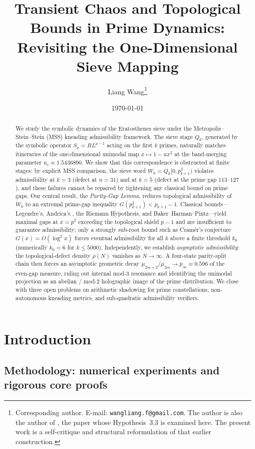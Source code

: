 \documentclass[11pt,a4paper]{article}
\title{Transient Chaos and Topological Bounds in Prime Dynamics:\\
       Revisiting the One-Dimensional Sieve Mapping}
\author[1]{Liang Wang\thanks{Corresponding author. E-mail:
\texttt{wangliang.f@gmail.com}. The author is also the author of
\cite{wang2026emergence}, the paper whose Hypothesis~3.3 is examined
here. The present work is a self-critique and structural reformulation
of that earlier construction.}}
\affil[1]{School of Artificial Intelligence and Automation,
Huazhong University of Science and Technology,
Wuhan 430074, P.R. China}
\date{\today}
\theoremstyle{definition}
\begin{document}
\maketitle

\begin{abstract}
We study the symbolic dynamics of the Eratosthenes sieve under the
Metropolis--Stein--Stein (MSS) kneading admissibility framework. The
sieve stage $Q_k$, generated by the symbolic operator $S_p = R L^{p-1}$
acting on the first $k$ primes, naturally matches itineraries of the
one-dimensional unimodal map $x \mapsto 1 - u x^2$ at the band-merging
parameter $u_c \approx 1.5436890$. We show that this correspondence is
obstructed at finite stages: by explicit MSS comparison, the sieve word
$W_k = Q_k[0, p_{k+1}^2)$ violates admissibility at $k = 3$ (defect at
$n = 31$) and at $k = 5$ (defect at the prime gap $113$--$127$), and
these failures cannot be repaired by tightening any classical bound on
prime gaps. Our central result, the \emph{Parity-Gap Lemma}, reduces
topological admissibility of $W_k$ to an extremal prime-gap inequality
$G(p_{k+1}^2) < p_{k+1} - 1$. Classical bounds---Legendre's, Andrica's
\cite{andrica1986conjecture}, the Riemann Hypothesis, and
Baker--Harman--Pintz---yield maximal gaps at $x = p^2$ exceeding the
topological shield $p - 1$ and are insufficient to guarantee
admissibility; only a strongly sub-root bound such as Cram\'er's
conjecture $G(x) = O(\log^2 x)$ forces eventual admissibility for all
$k$ above a finite threshold $k_0$ (numerically $k_0 = 6$ for
$k \leq 5000$). Independently, we establish \emph{asymptotic
admissibility}: the topological-defect density $\rho(N)$ vanishes as
$N \to \infty$. A four-state parity-split chain then forces an
asymptotic geometric decay $\mu_{2m+2}/\mu_{2m} \to p_\infty \approx 0.596$
of the even-gap measure, ruling out internal mod-3 resonance and
identifying the unimodal projection as an abelian / mod-2 holographic
image of the prime distribution. We close with three open problems on
arithmetic shadowing for prime constellations, non-autonomous kneading
metrics, and sub-quadratic admissibility verifiers.
\end{abstract}

\section{Introduction}

\subsection{Methodology: numerical experiments and rigorous core proofs}
\label{ssec:methodology}
\end{document}
